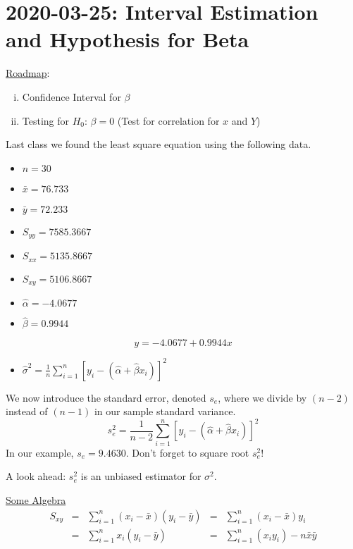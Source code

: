 \section{2020-03-25: Interval Estimation and Hypothesis for Beta}
\underline{Roadmap}:
\begin{enumerate}[(i)]
    \item Confidence Interval for $ \beta $
    \item Testing for $ H_0 $: $ \beta=0 $ (Test for correlation for
          $ x $ and $ Y $)
\end{enumerate}

\begin{exbox}
    \begin{example} \label{ex least sq}
        Last class we found the least square equation using the following data.
        \begin{itemize}
            \item $ n=30 $
            \item $ \bar{x}=76.733 $
            \item $ \bar{y}=72.233 $
            \item $ S_{yy}=7585.3667 $
            \item $ S_{xx}=5135.8667 $
            \item $ S_{xy}=5106.8667 $
            \item $ \hat{\alpha}=-4.0677 $
            \item $ \hat{\beta}=0.9944 $
        \end{itemize}
        \[ y=-4.0677+0.9944x \]
        \begin{itemize}
            \item $ \hat{\sigma}^2=\frac{1}{n} \sum\limits_{i=1}^{n} \left[ y_i-(\hat{\alpha}+\hat{\beta}x_i) \right]^2 $
        \end{itemize}
        We now introduce the standard error, denoted $ s_e $, where we divide by $ (n-2) $
        instead of $ (n-1) $ in our sample standard variance.
        \[ s_e^2=\frac{1}{n-2} \sum\limits_{i=1}^{n} \left[ y_i-(\hat{\alpha}+\hat{\beta}x_i) \right]^2 \]
        In our example, $ s_e=9.4630 $. Don't forget to square root $ s_e^2 $!

        A look ahead: $ s_e^2 $ is an unbiased estimator for $ \sigma^2 $.
    \end{example}
\end{exbox}
\underline{Some Algebra}
\[ \begin{aligned}
        S_{xy} & = & \sum\limits_{i=1}^{n} (x_i-\bar{x})(y_i-\bar{y}) & = & \sum\limits_{i=1}^{n} (x_i-\bar{x})y_i           \\
               & = & \sum\limits_{i=1}^{n} x_i(y_i-\bar{y})           & = & \sum\limits_{i=1}^{n} (x_iy_i) - n\bar{x}\bar{y}
    \end{aligned}
\]
